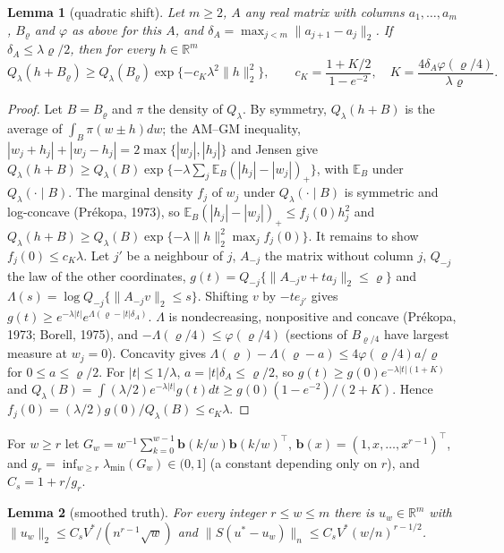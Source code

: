 \documentclass[11pt]{article}
\newtheorem{lemma}{Lemma}
\theoremstyle{definition}
\theoremstyle{remark}
\newcommand{\R}{\mathbb{R}}
\newcommand{\E}{\mathbb{E}}
\newcommand{\Ql}{Q_\lambda}
\newcommand{\nn}[1]{\|#1\|_n}
\begin{document}
\begin{lemma}[quadratic shift]\label{lem:qshift}
Let $m\ge2$, $A$ any real matrix with columns $a_1,\dots,a_m$, $B_\varrho$ and $\varphi$ as above for this $A$, and $\delta_A=\max_{j<m}\|a_{j+1}-a_j\|_2$. If $\delta_A\le\lambda\varrho/2$, then for every $h\in\R^m$
\[
\Ql(h+B_\varrho)\ge\Ql(B_\varrho)\exp\{-c_K\lambda^2\|h\|_2^2\},\qquad c_K=\frac{1+K/2}{1-e^{-2}},\quad K=\frac{4\delta_A\varphi(\varrho/4)}{\lambda\varrho}.
\]
\end{lemma}

\begin{proof}
Let $B=B_\varrho$ and $\pi$ the density of $\Ql$. By symmetry, $\Ql(h+B)$ is the average of $\int_B\pi(w\pm h)dw$; the AM--GM inequality, $|w_j+h_j|+|w_j-h_j|=2\max\{|w_j|,|h_j|\}$ and Jensen give $\Ql(h+B)\ge\Ql(B)\exp\{-\lambda\sum_j\E_B(|h_j|-|w_j|)_+\}$, with $\E_B$ under $\Ql(\cdot\mid B)$. The marginal density $f_j$ of $w_j$ under $\Ql(\cdot\mid B)$ is symmetric and log-concave (Pr\'ekopa, 1973), so $\E_B(|h_j|-|w_j|)_+\le f_j(0)h_j^2$ and
$\Ql(h+B)\ge\Ql(B)\exp\{-\lambda\|h\|_2^2\max_jf_j(0)\}$.
It remains to show $f_j(0)\le c_K\lambda$. Let $j'$ be a neighbour of $j$, $A_{-j}$ the matrix without column $j$, $Q_{-j}$ the law of the other coordinates, $g(t)=Q_{-j}\{\|A_{-j}v+ta_j\|_2\le\varrho\}$ and $\Lambda(s)=\log Q_{-j}\{\|A_{-j}v\|_2\le s\}$. Shifting $v$ by $-te_{j'}$ gives $g(t)\ge e^{-\lambda|t|}e^{\Lambda(\varrho-|t|\delta_A)}$. $\Lambda$ is nondecreasing, nonpositive and concave (Pr\'ekopa, 1973; Borell, 1975), and $-\Lambda(\varrho/4)\le\varphi(\varrho/4)$ (sections of $B_{\varrho/4}$ have largest measure at $w_j=0$). Concavity gives $\Lambda(\varrho)-\Lambda(\varrho-a)\le4\varphi(\varrho/4)a/\varrho$ for $0\le a\le\varrho/2$. For $|t|\le1/\lambda$, $a=|t|\delta_A\le\varrho/2$, so $g(t)\ge g(0)e^{-\lambda|t|(1+K)}$ and
$\Ql(B)=\int(\lambda/2)e^{-\lambda|t|}g(t)dt\ge g(0)(1-e^{-2})/(2+K)$. Hence $f_j(0)=(\lambda/2)g(0)/\Ql(B)\le c_K\lambda$.
\end{proof}

For $w\ge r$ let $G_w=w^{-1}\sum_{k=0}^{w-1}\mathbf b(k/w)\mathbf b(k/w)^\top$, $\mathbf b(x)=(1,x,\dots,x^{r-1})^\top$, and $g_r=\inf_{w\ge r}\lambda_{\min}(G_w)\in(0,1]$ (a constant depending only on $r$), and $C_s=1+r/g_r$.

\begin{lemma}[smoothed truth]\label{lem:smooth}
For every integer $r\le w\le m$ there is $u_w\in\R^m$ with $\|u_w\|_2\le C_sV^{*}/(n^{r-1}\sqrt w)$ and $\nn{S(u^{*}-u_w)}\le C_sV^{*}(w/n)^{r-1/2}$.
\end{lemma}
\end{document}

